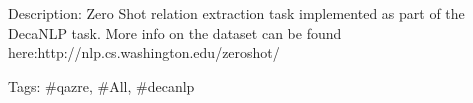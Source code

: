 Description\+: Zero Shot relation extraction task implemented as part of the Deca\+N\+LP task. More info on the dataset can be found here\+:http\+://nlp.cs.\+washington.\+edu/zeroshot/

Tags\+: \#qazre, \#\+All, \#decanlp 
